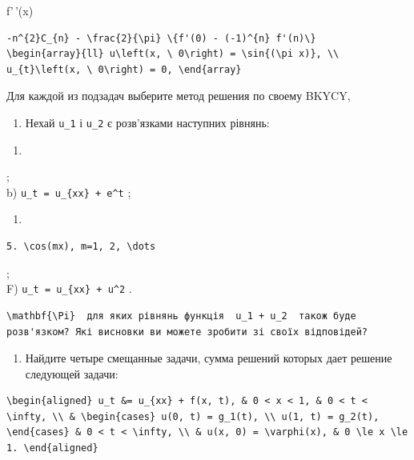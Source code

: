 \documentclass[
  ukrainian,
]{article}
\providecommand{\tightlist}{%
  \setlength{\itemsep}{0pt}\setlength{\parskip}{0pt}}
\begin{document}
f'\,'(x)

\begin{verbatim}
-n^{2}C_{n} - \frac{2}{\pi} \{f'(0) - (-1)^{n} f'(n)\}
\begin{array}{ll} u\left(x, \ 0\right) = \sin{(\pi x)}, \\ u_{t}\left(x, \ 0\right) = 0, \end{array}
\end{verbatim}

Для каждой из подзадач выберите метод решения по своему BKYCY,

\begin{enumerate}
\def\labelenumi{\arabic{enumi}.}
\setcounter{enumi}{2}
\tightlist
\item
  Нехай \texttt{u\_1} і \texttt{u\_2} є розв'язками наступних рівнянь:
\end{enumerate}

\begin{enumerate}
\def\labelenumi{\alph{enumi})}
\tightlist
\item
\end{enumerate}

;\\
b) \texttt{u\_t\ =\ u\_\{xx\}\ +\ e\^{}t} ;

\begin{enumerate}
\def\labelenumi{\Alph{enumi})}
\setcounter{enumi}{1}
\tightlist
\item
\end{enumerate}

\begin{verbatim}
5. \cos(mx), m=1, 2, \dots
\end{verbatim}

;\\
F) \texttt{u\_t\ =\ u\_\{xx\}\ +\ u\^{}2} .

\begin{verbatim}
\mathbf{\Pi}  для яких рівнянь функція  u_1 + u_2  також буде розв'язком? Які висновки ви можете зробити зі своїх відповідей?
\end{verbatim}

\begin{enumerate}
\def\labelenumi{\arabic{enumi}.}
\setcounter{enumi}{3}
\tightlist
\item
  Найдите четыре смещанные задачи, сумма решений которых дает решение
  следующей задачи:
\end{enumerate}

\begin{verbatim}
\begin{aligned} u_t &= u_{xx} + f(x, t), & 0 < x < 1, & 0 < t < \infty, \\ & \begin{cases} u(0, t) = g_1(t), \\ u(1, t) = g_2(t), \end{cases} & 0 < t < \infty, \\ & u(x, 0) = \varphi(x), & 0 \le x \le 1. \end{aligned}
\end{verbatim}
\end{document}

